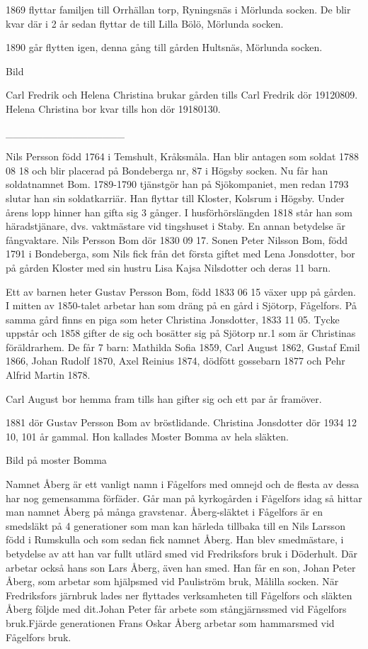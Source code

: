 1869 flyttar familjen till Orrhällan torp, Ryningsnäs i Mörlunda socken. De blir kvar där i 2 år sedan flyttar de till Lilla Bölö, Mörlunda socken.


1890 går flytten igen, denna gång till gården Hultsnäs, Mörlunda socken.


Bild


Carl Fredrik och Helena Christina brukar gården tills Carl Fredrik dör 19120809. Helena Christina bor kvar tills hon dör 19180130.




________________



Nils Persson född 1764 i Temshult, Kråksmåla. 
Han blir antagen som soldat 1788 08 18 och blir placerad på Bondeberga nr, 87 i Högsby socken. Nu får han soldatnamnet Bom.
1789-1790 tjänstgör han på Sjökompaniet, men redan 1793 slutar han sin soldatkarriär.
Han flyttar till Kloster, Kolsrum i Högsby. Under årens lopp hinner han gifta sig 3 gånger.
I husförhörslängden 1818 står han som häradstjänare, dvs. vaktmästare vid tingshuset i Staby.
En annan betydelse är fångvaktare.
Nils Persson Bom dör 1830 09 17.
Sonen Peter Nilsson Bom, född 1791 i Bondeberga, som Nils fick från det första giftet med Lena Jonsdotter, bor på gården Kloster med sin hustru Lisa Kajsa Nilsdotter och deras 11 barn.


Ett av barnen heter Gustav Persson Bom, född 1833 06 15 växer upp på gården. I mitten av 1850-talet arbetar han som dräng på en gård i Sjötorp, Fågelfors. På samma gård finns en piga som heter Christina Jonsdotter, 1833 11 05. Tycke uppstår och 1858 gifter de sig och bosätter sig på Sjötorp nr.1 som är Christinas föräldrarhem. De får 7 barn:
Mathilda Sofia 1859, Carl August 1862, Gustaf Emil 1866, Johan Rudolf 1870, Axel Reinius 1874, dödfött gossebarn 1877 och Pehr Alfrid Martin 1878.


Carl August bor hemma fram tills han gifter sig och ett par år framöver.


1881 dör Gustav Persson Bom av bröstlidande. Christina Jonsdotter dör 1934 12 10, 101 år gammal. Hon kallades Moster Bomma av hela släkten.


Bild på moster Bomma

 

Namnet Åberg är ett vanligt namn i Fågelfors med omnejd och de flesta av dessa har nog gemensamma förfäder. Går man på kyrkogården i Fågelfors idag så hittar man namnet Åberg på många gravstenar. Åberg-släktet i Fågelfors är en smedsläkt på 4 generationer som man kan härleda tillbaka till en Nils Larsson född i Rumskulla och som sedan fick namnet Åberg. Han blev smedmästare, i betydelse av att han var fullt utlärd smed vid Fredriksfors bruk i Döderhult. Där arbetar också hans son Lars Åberg, även han smed. Han får en son, Johan Peter Åberg, som arbetar som hjälpsmed vid Pauliström bruk, Målilla socken. När Fredriksfors järnbruk lades ner flyttades verksamheten till Fågelfors och släkten Åberg följde med dit.Johan Peter får arbete som stångjärnssmed vid Fågelfors bruk.Fjärde generationen  Frans Oskar Åberg arbetar som hammarsmed vid Fågelfors bruk.  


